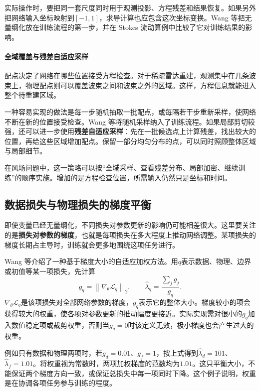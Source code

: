 实际操作时，要把同一套尺度同时用于观测投影、方程残差和结果恢复。如果另外把网络输入坐标映射到$[-1,1]$，求导计算也应包含这次坐标变换。Wang 等把无量纲化放在训练流程的第一步，并在 Stokes 流动算例中比较了它对训练结果的影响\cite{wang2023expert}。

\paragraph{全域覆盖与残差自适应采样}
配点决定了网络在哪些位置接受方程检查。对于稀疏雷达重建，观测集中在几条波束上，物理配点则可以覆盖波束之间和波束之外的区域。这样，方程信息就能进入整个待重建区域。

一种容易实现的做法是每一步随机抽取一批配点，或每隔若干步重新采样，使网络不断在新的位置接受检查。Wang 等将随机采样纳入了训练流程\cite{wang2023expert}。如果局部剪切较强，还可以进一步使用\textbf{残差自适应采样}：先在一批候选点上计算残差，找出较大的位置，再给这些区域增加配点。保留一部分均匀分布的点，可以同时照顾整体区域与局部细节。

在风场问题中，这一策略可以按“全域采样、查看残差分布、局部加密、继续训练”的顺序实施。增加的是方程检查位置，所需输入仍然只是坐标和时间。

\subsection{数据损失与物理损失的梯度平衡}
即使变量已经无量纲化，不同损失对参数更新的影响仍可能相差很大。这里要关注的是\textbf{损失对参数的梯度}，也就是每项损失在多大程度上推动网络调整。某项损失的梯度长期占主导时，训练就会更多地围绕这项任务进行。

Wang 等介绍了一种基于梯度大小的自适应加权方法\cite{wang2023expert}。用$q$表示数据、物理、边界或初值等某一项损失，先计算
\begin{equation}
 g_q=\left\|\nabla_\theta\mathcal L_q\right\|_2,\qquad
 \widehat\lambda_q=\frac{\sum_j g_j}{g_q}.
 \label{eq:pinn-gradient-balance}
\end{equation}
$\nabla_\theta\mathcal L_q$是该项损失对全部网络参数的梯度，$g_q$表示它的整体大小。梯度较小的项会获得较大的权重，使各项对参数更新的推动幅度更接近。实际实现需对很小的$g_q$加入数值稳定项或裁剪权重，否则当$g_q=0$时该定义无效，极小梯度也会产生过大的权重。

例如只有数据和物理两项时，若$g_d=0.01$、$g_f=1$，按上式得到$\widehat\lambda_d=101$、$\widehat\lambda_f=1.01$。将权重视为常数时，两项加权梯度的范数均为$1.01$。这只平衡大小，不能保证两个梯度方向一致，或保证总损失中每一项同时下降。这个例子说明，权重是在协调各项任务参与训练的程度。

